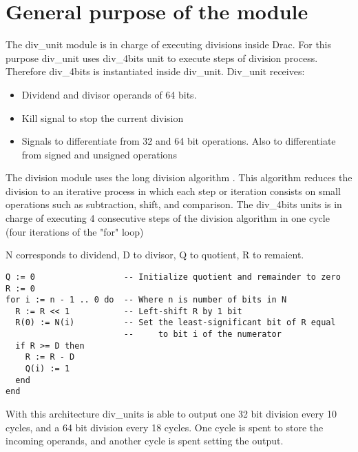 \section{General purpose of the module}
\label{chapter1}

The div\_unit module is in charge of executing divisions inside Drac. For this purpose div\_unit uses div\_4bits unit to execute steps of division process. Therefore div\_4bits is instantiated inside div\_unit. Div\_unit receives:

\begin{itemize}
  \item Dividend and divisor operands of 64 bits.
  \item Kill signal to stop the current division
  \item Signals to differentiate from 32 and 64 bit operations. Also to differentiate from signed and unsigned operations
\end{itemize}

The division module uses the long division algorithm \cite{longDivision}. This algorithm reduces the division to an iterative process in which each step or iteration consists on small operations such as subtraction, shift, and comparison. The div\_4bits units is in charge of executing 4 consecutive steps of the division algorithm in one cycle (four iterations of the "for" loop)

N corresponds to dividend, D to divisor, Q to quotient, R to remaient.

\begin{lstlisting}[label=division, caption=Long division algorithm]
Q := 0                  -- Initialize quotient and remainder to zero
R := 0                     
for i := n - 1 .. 0 do  -- Where n is number of bits in N
  R := R << 1           -- Left-shift R by 1 bit
  R(0) := N(i)          -- Set the least-significant bit of R equal 
                        --     to bit i of the numerator
  if R >= D then
    R := R - D
    Q(i) := 1
  end
end
\end{lstlisting}

With this architecture div\_units is able to output one 32 bit division every 10 cycles, and a 64 bit division every 18 cycles. One cycle is spent to store the incoming operands, and another cycle is spent setting the output.


